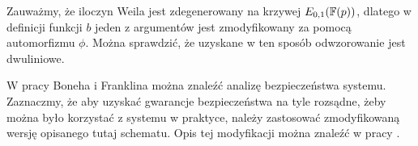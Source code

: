 \begin{remark}
Zauważmy, że iloczyn Weila jest zdegenerowany na krzywej $E_{0,1}(\mathbb{F}(p))$,
dlatego w definicji funkcji $b$ jeden z argumentów jest zmodyfikowany
za pomocą automorfizmu $\phi$.
Można sprawdzić, że uzyskane w ten sposób odwzorowanie jest dwuliniowe.
\end{remark}

\noindent
W pracy Boneha i Franklina można znaleźć analizę bezpieczeństwa systemu.
Zaznaczmy, że aby uzyskać gwarancje bezpieczeństwa na tyle rozsądne,
żeby można było korzystać z systemu w praktyce,
należy zastosować zmodyfikowaną wersję opisanego tutaj schematu.
Opis tej modyfikacji można znaleźć w pracy \cite{fujisakiokamoto}.
